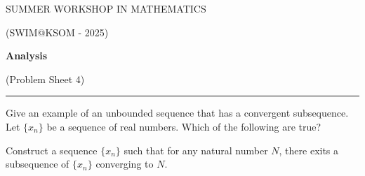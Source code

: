 \documentclass[fleqn]{exam}
\begin{document}
\begin{center}
	{\huge SUMMER WORKSHOP IN MATHEMATICS}
	
	\bigskip
	
	{\large (SWIM@KSOM - 2025)}
	
	\bigskip


	\textbf{\Large Analysis}
	
	\medskip

	{\large (Problem Sheet 4)}

	\medskip
	
	\hrule
\end{center}


\begin{questions}
	\question Give an example of an unbounded sequence that has a convergent subsequence.
	\question Let $\{x_n\}$ be a sequence of real numbers. Which of the following are true?
	\question Construct a sequence $\{x_n\}$ such that for any natural number $N$, there exits a subsequence of $\{x_n\}$ converging to $N$. 
\end{questions}
\end{document}

